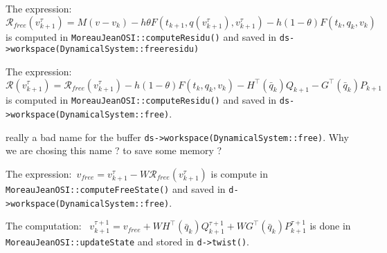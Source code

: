 The expression:~$\mathcal R_{free}(v^\tau_{k+1}) = M(v-v_k) - h  \theta F(t_{k+1}, q(v^\tau_{k+1}),v^\tau_{k+1}) - h (1- \theta) F(t_{k}, q_{k},v_{k})$ is computed in {\tt MoreauJeanOSI::computeResidu()} and saved in {\tt ds->workspace(DynamicalSystem::freeresidu)}


The expression:~$\mathcal R(v^\tau_{k+1}) =\mathcal R_{free}(v^\tau_{k+1}) - h (1- \theta) F(t_{k}, q_{k},v_{k}) - H^\top(\bar q_k) Q_{k+1} - G^\top(\bar q_k) P_{k+1}  $ is computed in {\tt MoreauJeanOSI::computeResidu()} and saved in {\tt ds->workspace(DynamicalSystem::free)}.
\begin{ndrva}
  really a bad name for the buffer {\tt ds->workspace(DynamicalSystem::free)}. Why we are chosing this name ? to save some memory ?
\end{ndrva}


The expression:~$v_{free}  = v^{\tau}_{k+1} - W  \mathcal R_{free}(v^\tau_{k+1})$ is compute in {\tt MoreauJeanOSI::computeFreeState()} and saved in {\tt d->workspace(DynamicalSystem::free)}. 



The computation:~ $v^{\tau+1}_{k+1} = v_{free} + W   H^\top(\bar q_k) Q^{\tau+1}_{k+1} + W G^\top(\bar q_k) P^{\tau+1}_{k+1}$ is done in {\tt MoreauJeanOSI::updateState} and stored in {\tt d->twist()}.\\


